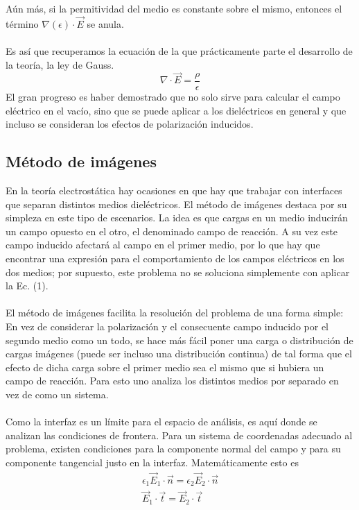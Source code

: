 \documentclass[12pt, notitlepage]{article}
\begin{document}
Aún más, si la permitividad del medio es constante sobre el mismo, entonces el término $\nabla (\epsilon)\cdot\vec{E}$ se anula.\\\\
Es así que recuperamos la ecuación de la que prácticamente parte el desarrollo de la teoría, la ley de Gauss.
\begin{equation}
\nabla\cdot\vec{E} = \frac{\rho}{\epsilon}
\end{equation}
El gran progreso es haber demostrado que no solo sirve para calcular el campo eléctrico en el vacío, sino que se puede aplicar a los dieléctricos en general y que incluso se consideran los efectos de polarización inducidos.

\subsection{Método de imágenes}
En la teoría electrostática hay ocasiones en que hay que trabajar con interfaces que separan distintos medios dieléctricos. El método de imágenes destaca por su simpleza en este tipo de escenarios. La idea es que cargas en un medio inducirán un campo opuesto en el otro, el denominado campo de reacción. A su vez este campo inducido afectará al campo en el primer medio, por lo que hay que encontrar una expresión para el comportamiento de los campos eléctricos en los dos medios; por supuesto, este problema no se soluciona simplemente con aplicar la Ec. (1).\\\\
El método de imágenes facilita la resolución del problema de una forma simple: En vez de considerar la polarización y el consecuente campo inducido por el segundo medio como un todo, se hace más fácil poner una carga o distribución de cargas imágenes (puede ser incluso una distribución continua) de tal forma que el efecto de dicha carga sobre el primer medio sea el mismo que si hubiera un campo de reacción. Para esto uno analiza los distintos medios por separado en vez de como un sistema.\\\\
Como la interfaz es un límite para el espacio de análisis, es aquí donde se analizan las condiciones de frontera. Para un sistema de coordenadas adecuado al problema, existen condiciones para la componente normal del campo y para su componente tangencial justo en la interfaz. Matemáticamente esto es
\begin{gather}
\epsilon_1\vec{E}_1\cdot\vec{n} = \epsilon_2\vec{E}_2\cdot\vec{n}\\
\vec{E}_1\cdot\vec{t} = \vec{E}_2\cdot\vec{t}
\end{gather}
\end{document}
